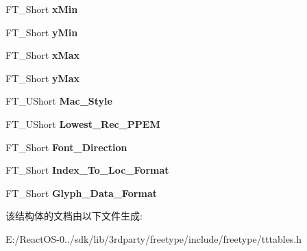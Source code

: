 \begin{DoxyCompactItemize}
F\+T\+\_\+\+Short {\bfseries x\+Min}
\item 
\mbox{\label{struct_t_t___header___ac6aad4966bac8a96c5bc48765b3d694a}} 
F\+T\+\_\+\+Short {\bfseries y\+Min}
\item 
\mbox{\label{struct_t_t___header___a593b9cc3e11532972a7fc96944dd1ae9}} 
F\+T\+\_\+\+Short {\bfseries x\+Max}
\item 
\mbox{\label{struct_t_t___header___a02d236cd8150c00e886a0c487c04dffa}} 
F\+T\+\_\+\+Short {\bfseries y\+Max}
\item 
\mbox{\label{struct_t_t___header___a82f2a5a836b802e44ff712b3afc8745c}} 
F\+T\+\_\+\+U\+Short {\bfseries Mac\+\_\+\+Style}
\item 
\mbox{\label{struct_t_t___header___a1d20801c3482dee2529d294441ed9af3}} 
F\+T\+\_\+\+U\+Short {\bfseries Lowest\+\_\+\+Rec\+\_\+\+P\+P\+EM}
\item 
\mbox{\label{struct_t_t___header___a1cb7d8a2a76ae1acda3ac94bcd555954}} 
F\+T\+\_\+\+Short {\bfseries Font\+\_\+\+Direction}
\item 
\mbox{\label{struct_t_t___header___a05a488607bfae319de096b4bd9cf8c6d}} 
F\+T\+\_\+\+Short {\bfseries Index\+\_\+\+To\+\_\+\+Loc\+\_\+\+Format}
\item 
\mbox{\label{struct_t_t___header___adeeedce4bb708c3e068ed80366ec921d}} 
F\+T\+\_\+\+Short {\bfseries Glyph\+\_\+\+Data\+\_\+\+Format}
\end{DoxyCompactItemize}


该结构体的文档由以下文件生成\+:\begin{DoxyCompactItemize}
\item 
E\+:/\+React\+O\+S-\/0../sdk/lib/3rdparty/freetype/include/freetype/tttables.\+h\end{DoxyCompactItemize}
